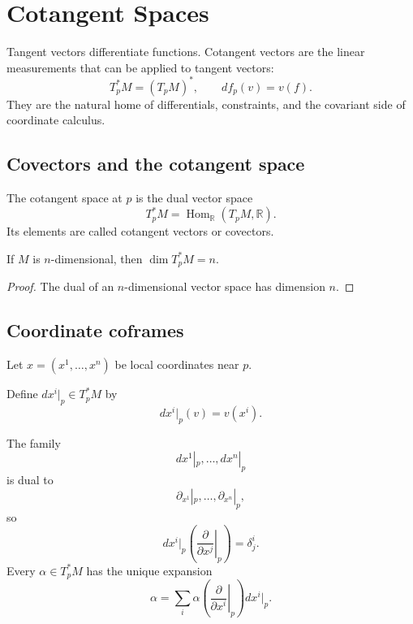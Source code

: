 \chapter{Cotangent Spaces}
\label{ch:vii05-cotangent-spaces}

Tangent vectors differentiate functions. Cotangent vectors are the linear measurements that can be applied to tangent vectors:
\[
\boxed{T_p^*M=(T_pM)^*,\qquad df_p(v)=v(f).}
\]
They are the natural home of differentials, constraints, and the covariant side of coordinate calculus.

\section{Covectors and the cotangent space}
\begin{definition}\label{def:vii05-cotangent-space}
The cotangent space at \(p\) is the dual vector space
\[
T_p^*M=\operatorname{Hom}_{\mathbb R}(T_pM,\mathbb R).
\]
Its elements are called cotangent vectors or covectors.
\end{definition}

\begin{proposition}[Dimension]\label{prop:vii05-dimension}
If \(M\) is \(n\)-dimensional, then \(\dim T_p^*M=n\).
\end{proposition}
\begin{proof}
The dual of an \(n\)-dimensional vector space has dimension \(n\).
\end{proof}

\section{Coordinate coframes}
Let \(x=(x^1,\dots,x^n)\) be local coordinates near \(p\).

\begin{definition}\label{def:vii05-coordinate-covectors}
Define \(dx^i|_p\in T_p^*M\) by
\[
dx^i|_p(v)=v(x^i).
\]
\end{definition}

\begin{theorem}\label{thm:vii05-dual-basis}
The family
\[
dx^1|_p,\dots,dx^n|_p
\]
is dual to
\[
\partial_{x^1}|_p,\dots,\partial_{x^n}|_p,
\]
so
\[
dx^i|_p\!\left(\left.\frac{\partial}{\partial x^j}\right|_p\right)=\delta^i_j.
\]
Every \(\alpha\in T_p^*M\) has the unique expansion
\[
\alpha=\sum_i \alpha\!\left(\left.\frac{\partial}{\partial x^i}\right|_p\right)dx^i|_p.
\]
\end{theorem}

